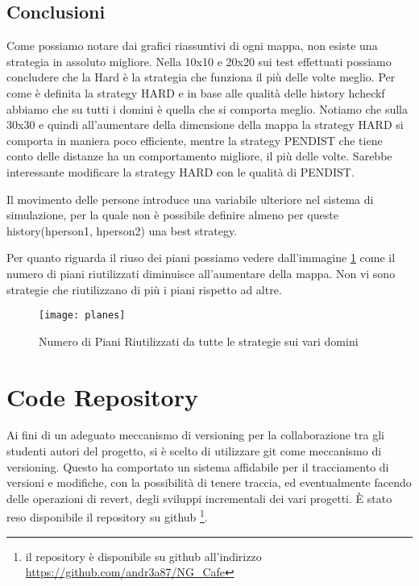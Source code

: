 \newpage
\section{Conclusioni}
Come possiamo notare dai grafici riassuntivi di ogni mappa, non esiste una strategia in assoluto migliore. Nella 10x10 e 20x20 sui test effettuati possiamo concludere che la Hard è la strategia che funziona il più delle volte meglio. Per come è definita la strategy HARD e in base alle qualità delle history hcheckf abbiamo che su tutti i domini è quella che si comporta meglio.
Notiamo che sulla 30x30 e quindi all'aumentare della dimensione della mappa la strategy HARD si comporta in maniera poco efficiente, mentre la strategy PENDIST che tiene conto delle distanze ha un comportamento migliore, il più delle volte. Sarebbe interessante modificare la strategy HARD con le qualità di PENDIST. 

Il movimento delle persone introduce una variabile ulteriore nel sistema di simulazione, per la quale non è possibile definire almeno per queste history(hperson1, hperson2) una best strategy.

Per quanto riguarda il riuso dei piani possiamo vedere dall'immagine \ref{fig:figure13} come il numero di piani riutilizzati diminuisce all'aumentare della mappa. Non vi sono strategie che riutilizzano di più i piani rispetto ad altre.
\begin{figure}[h!tp]
  \texttt{[image: planes]}
  \caption{Numero di Piani Riutilizzati da tutte le strategie sui vari domini}
  \label{fig:figure13}
\end{figure}


\appendix
\chapter{Code Repository}

Ai fini di un adeguato meccanismo di versioning per la collaborazione tra gli studenti autori del progetto, si è scelto di utilizzare git come meccanismo di versioning.
Questo ha comportato un sistema affidabile per il tracciamento di versioni e modifiche, con la possibilità di tenere traccia, ed eventualmente facendo delle operazioni di revert, degli sviluppi incrementali dei vari progetti.
È stato reso disponibile il repository su github \footnote{il repository è disponibile su github all'indirizzo \url{https://github.com/andr3a87/NG_Cafe} }.